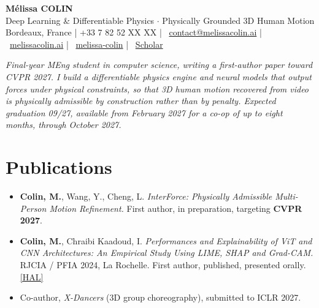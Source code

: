 \documentclass[10pt, letterpaper]{article}
\providecommand{\myphone}{+33 7 82 52 XX XX}
\begin{document}
\begin{center}
    {\fontsize{19}{19}\selectfont \textbf{Mélissa COLIN}} \\[3pt]
    {\normalsize Deep Learning \& Differentiable Physics $\cdot$ Physically Grounded 3D Human Motion} \\[3pt]

    \small{
    \faMapMarker* Bordeaux, France \;|\;
    \faPhone* \myphone{} \;|\;
    \faEnvelope~\href{mailto:contact@melissacolin.ai}{contact@melissacolin.ai} \;|\;
    \faGlobe~\href{https://melissacolin.ai}{melissacolin.ai} \;|\;
    \faGithub~\href{https://github.com/melissa-colin}{melissa-colin} \;|\;
    \faGraduationCap~\href{https://scholar.google.com/citations?user=7r7iFpsAAAAJ}{Scholar}
    }
\end{center}

\vspace{1pt}

{\small \textit{Final-year MEng student in computer science, writing a first-author paper toward CVPR 2027. I build a differentiable physics engine and neural models that output forces
under physical constraints, so that 3D human motion recovered from video is physically
admissible by construction rather than by penalty. Expected graduation 09/27, available from
February 2027 for a co-op of up to eight months, through October 2027.}}

\section{Publications}
\begin{itemize}
    \item \textbf{Colin, M.}, Wang, Y., Cheng, L. \textit{InterForce: Physically Admissible Multi-Person Motion Refinement.} First author, in preparation, targeting \textbf{CVPR 2027}.
    \item \textbf{Colin, M.}, Chraibi Kaadoud, I. \textit{Performances and Explainability of ViT and CNN Architectures: An Empirical Study Using LIME, SHAP and Grad-CAM.} RJCIA / PFIA 2024, La Rochelle. First author, published, presented orally. \href{https://hal.science/hal-04641791}{[HAL]}
    \item Co-author, \textit{X-Dancers} (3D group choreography), submitted to ICLR 2027.
\end{itemize}
\end{document}
